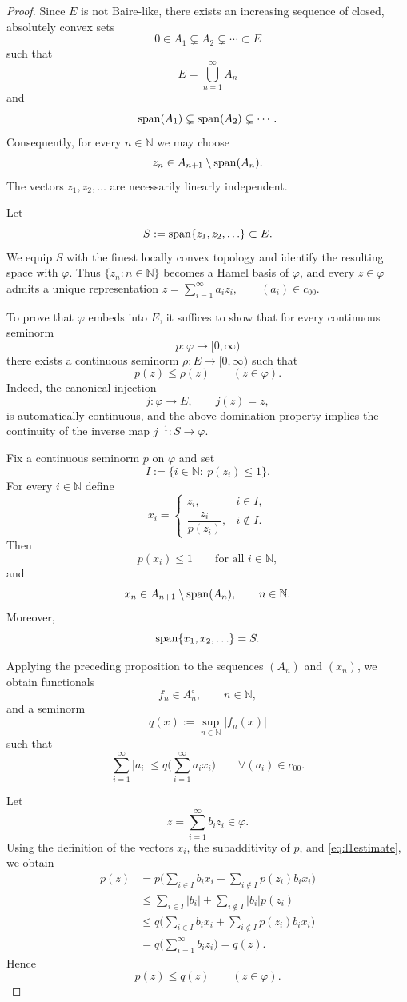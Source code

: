 \documentclass[12pt]{amsart}
\theoremstyle{plain}
\theoremstyle{definition}
\theoremstyle{remark}
\begin{document}
\begin{proof}
Since $E$ is not Baire-like, there exists an increasing sequence of closed, absolutely convex  sets
\[
0\in A_1\subsetneq A_2\subsetneq \cdots \subset E
\]
such that
\[
E=\bigcup_{n=1}^{\infty}A_n
\]
and
\[
{\rm span}(A_1)\subsetneq {\rm span}(A_2)\subsetneq\cdots.
\]
Consequently, for every $n\in\mathbb N$ we may choose
\[
z_n\in A_{n+1}\setminus {\rm span}(A_n).
\]
The vectors $z_1,z_2,\ldots$ are necessarily linearly independent.

Let
\[
S:={\rm span}\{z_1,z_2,\ldots\}\subset E.
\]
We equip $S$ with the finest locally convex topology and identify the resulting space with $\varphi$. Thus
$\{z_n:n\in\mathbb N\}$ becomes a Hamel basis of $\varphi$, and every
$z\in\varphi$
admits a unique representation
$z=\sum_{i=1}^{\infty}a_i z_i,
\qquad (a_i)\in c_{00}.$


To prove that $\varphi$ embeds into $E$, it suffices to show that for every continuous seminorm
\[
p:\varphi\to [0,\infty)
\]
there exists a continuous seminorm
$\rho:E\to[0,\infty)$
such that
\[
p(z)\le \rho(z)
\qquad (z\in\varphi).
\]
Indeed, the canonical injection
\[
j:\varphi\to E,\qquad j(z)=z,
\]
is automatically continuous, and the above domination property implies the continuity of the inverse map
$j^{-1}:S\to\varphi$.

Fix a continuous seminorm $p$ on $\varphi$ and set
\[
I:=\{i\in\mathbb N:\ p(z_i)\le 1\}.
\]
For every $i\in\mathbb N$ define
\[
x_i=
\begin{cases}
z_i, & i\in I,\\[2mm]
\dfrac{z_i}{p(z_i)}, & i\notin I.
\end{cases}
\]
Then
\[
p(x_i)\le 1
\qquad\text{for all }i\in\mathbb N,
\]
and
\[
x_n\in A_{n+1}\setminus {\rm span}(A_n),
\qquad n\in\mathbb N.
\]
Moreover,
\[
{\rm span}\{x_1,x_2,\ldots\}=S.
\]

Applying the preceding proposition to the sequences $(A_n)$ and $(x_n)$, we obtain functionals
\[
f_n\in A_n^\circ,\qquad n\in\mathbb N,
\]
and a seminorm
\[
q(x):=\sup_{n\in\mathbb N}|f_n(x)|
\]
such that
\begin{equation}\label{eq:l1estimate}
\sum_{i=1}^{\infty}|a_i|
\le
q\Big(\sum_{i=1}^{\infty}a_i x_i\Big)
\qquad
\forall (a_i)\in c_{00}.
\end{equation}

Let
\[
z=\sum_{i=1}^{\infty}b_i z_i\in \varphi .
\]
Using the definition of the vectors $x_i$, the subadditivity of $p$, and \eqref{eq:l1estimate}, we obtain
\[
\begin{aligned}
p(z)
&=
p\Big(
\sum_{i\in I} b_i x_i
+
\sum_{i\notin I} p(z_i)b_i x_i
\Big) \\[1mm]
&\le
\sum_{i\in I}|b_i|
+
\sum_{i\notin I}|b_i|p(z_i)\\[1mm]
&\le
q\Big(
\sum_{i\in I} b_i x_i
+
\sum_{i\notin I} p(z_i)b_i x_i
\Big)\\[1mm]
&=
q\Big(
\sum_{i=1}^{\infty}b_i z_i
\Big)
=q(z).
\end{aligned}
\]
Hence
\[
p(z)\le q(z)
\qquad (z\in\varphi).
\]


\end{proof}
\end{document}
